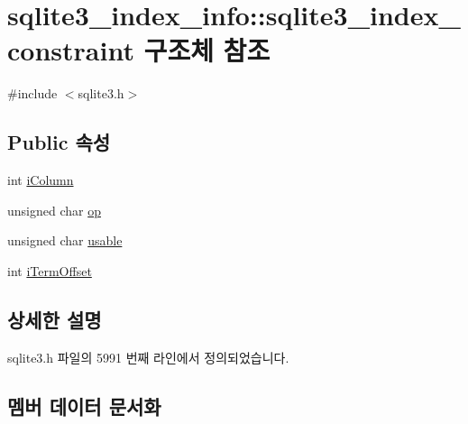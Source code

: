 \hypertarget{structsqlite3__index__info_1_1sqlite3__index__constraint}{}\section{sqlite3\+\_\+index\+\_\+info\+:\+:sqlite3\+\_\+index\+\_\+constraint 구조체 참조}
\label{structsqlite3__index__info_1_1sqlite3__index__constraint}


{\ttfamily \#include $<$sqlite3.\+h$>$}

\subsection*{Public 속성}
\begin{DoxyCompactItemize}
\item 
int \hyperlink{structsqlite3__index__info_1_1sqlite3__index__constraint_a0f1e207060420058ee2881f2ea368e3a}{i\+Column}
\item 
unsigned char \hyperlink{structsqlite3__index__info_1_1sqlite3__index__constraint_a362f4ec1f71975cb0ac39a8b5e4b1476}{op}
\item 
unsigned char \hyperlink{structsqlite3__index__info_1_1sqlite3__index__constraint_ae16e62caeab743cc68bb22227dacb501}{usable}
\item 
int \hyperlink{structsqlite3__index__info_1_1sqlite3__index__constraint_a4e8368da66f34b7f07b369984b813d1b}{i\+Term\+Offset}
\end{DoxyCompactItemize}


\subsection{상세한 설명}


sqlite3.\+h 파일의 5991 번째 라인에서 정의되었습니다.



\subsection{멤버 데이터 문서화}
\mbox{\label{structsqlite3__index__info_1_1sqlite3__index__constraint_a0f1e207060420058ee2881f2ea368e3a}} 
